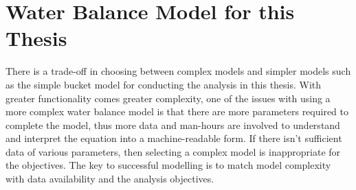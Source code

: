 \section{Water Balance Model for this Thesis}
There is a trade-off in choosing between complex models and simpler models such as the simple bucket model for conducting the analysis in this thesis. With greater functionality comes greater complexity, one of the issues with using a more complex water balance model is that there are more parameters required to complete the model, thus more data and man-hours are involved to understand and interpret the equation into a machine-readable form. If there isn't sufficient data of various parameters, then selecting a complex model is inappropriate for the objectives. The key to successful modelling is to match model complexity with data availability and the analysis objectives.
